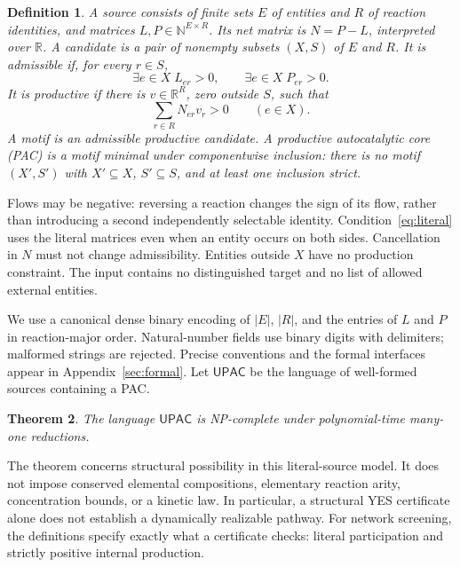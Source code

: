 \documentclass[11pt,a4paper]{article}
\newtheorem{theorem}{Theorem}
\newtheorem{definition}[theorem]{Definition}
\newcommand{\UPAC}{\mathsf{UPAC}}
\newcommand{\R}{\mathbb R}
\newcommand{\N}{\mathbb N}
\begin{document}
\begin{definition}
A \emph{source} consists of finite sets $E$ of entities and $R$ of reaction
identities, and matrices $L,P\in\N^{E\times R}$. Its net matrix is
$N=P-L$, interpreted over $\R$. A candidate is a pair of nonempty subsets
$(X,S)$ of $E$ and $R$. It is \emph{admissible} if, for every $r\in S$,
\begin{equation}\label{eq:literal}
 \exists e\in X\; L_{er}>0,
 \qquad \exists e\in X\; P_{er}>0.
\end{equation}
It is \emph{productive} if there is $v\in\R^R$, zero outside $S$, such that
\begin{equation}\label{eq:production}
 \sum_{r\in R}N_{er}v_r>0\qquad(e\in X).
\end{equation}
A \emph{motif} is an admissible productive candidate. A \emph{productive
autocatalytic core} (PAC) is a motif minimal under componentwise inclusion:
there is no motif $(X',S')$ with $X'\subseteq X$, $S'\subseteq S$, and at
least one inclusion strict.
\end{definition}

Flows may be negative: reversing a reaction changes the sign of its flow,
rather than introducing a second independently selectable identity.
Condition~\eqref{eq:literal} uses the literal matrices even when an entity
occurs on both sides. Cancellation in $N$ must not change admissibility.
Entities outside $X$ have no production constraint. The input contains no
distinguished target and no list of allowed external entities.

We use a canonical dense binary encoding of $|E|$, $|R|$, and the entries
of $L$ and $P$ in reaction-major order. Natural-number fields use binary
digits with delimiters; malformed strings are rejected. Precise conventions
and the formal interfaces appear in Appendix~\ref{sec:formal}.
Let $\UPAC$ be the language of well-formed sources containing a PAC.

\begin{theorem}\label{thm:main}
The language $\UPAC$ is NP-complete under polynomial-time many-one reductions.
\end{theorem}

The theorem concerns structural possibility in this literal-source model.
It does not impose conserved elemental compositions, elementary reaction
arity, concentration bounds, or a kinetic law. In particular, a structural
YES certificate alone does not establish a dynamically realizable pathway.
For network screening, the definitions specify exactly what a certificate
checks: literal participation and strictly positive internal production.
\end{document}
